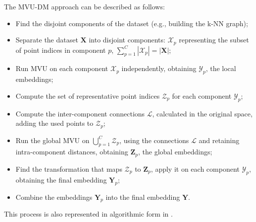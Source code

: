     The \ac{MVU-DM} approach can be described as follows:
    \begin{itemize}
        \item Find the disjoint components of the dataset (e.g., building the k-NN graph);
        \item Separate the dataset $\boldsymbol{X}$ into  disjoint components: $\boldsymbol{\mathcal{X}}_p$ representing the subset of point indices in component $p$, $\sum_{p=1}^C |\boldsymbol{\mathcal{X}}_p| = |\boldsymbol{X}|$;
        \item Run \ac{MVU} on each component $\boldsymbol{\mathcal{X}}_p$ independently, obtaining $\boldsymbol{\mathcal{Y}}_p$, the local embeddings;
        \item Compute the set of representative point indices $\boldsymbol{\mathcal{Z}}_p$ for each component $\boldsymbol{\mathcal{Y}}_p$;
        \item Compute the inter-component connections $\boldsymbol{\mathcal{L}}$, calculated in the original space, adding the used points to $\boldsymbol{\mathcal{Z}}_p$;
        \item Run the global \ac{MVU} on $\bigcup_{p=1}^{C} \boldsymbol{\mathcal{Z}}_p$, using the connections $\boldsymbol{\mathcal{L}}$ and retaining intra-component distances, obtaining $\boldsymbol{Z}_p$, the global embeddings;
        \item Find the transformation that maps $\boldsymbol{\mathcal{Z}}_p$ to $\boldsymbol{Z}_p$, apply it on each component $\boldsymbol{\mathcal{Y}}_p$, obtaining the final embedding $\boldsymbol{Y}_p$;
        \item Combine the embeddings $\boldsymbol{Y}_p$ into the final embedding $\boldsymbol{Y}$.
    \end{itemize}

    This process is also represented in algorithmic form in .

